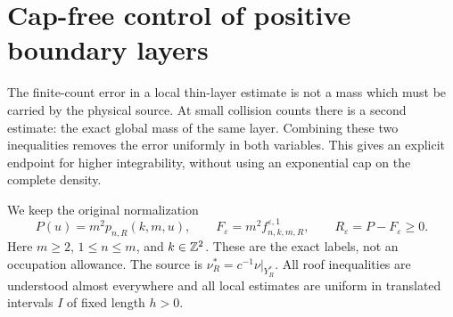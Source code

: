 \section{Cap-free control of positive boundary layers}
\label{sec:v55-cap-free}
The finite-count error in a local thin-layer estimate is not a mass
which must be carried by the physical source. At small collision counts
there is a second estimate: the exact global mass of the same layer.
Combining these two inequalities removes the error uniformly in both
variables. This gives an explicit endpoint for higher integrability,
without using an exponential cap on the complete density.

We keep the original normalization
\[
 P(u)=m^2p_{n,R}(k,m,u),\qquad
 F_\varepsilon=m^2f^{\varepsilon,1}_{n,k,m,R},\qquad
 R_\varepsilon=P-F_\varepsilon\ge0.
\]
Here $m\ge2$, $1\le n\le m$, and $k\in\mathbb Z^2$. These are the
exact labels, not an occupation allowance. The source is
$\nu_R^*=c^{-1}\nu|_{Y_R^*}$. All roof inequalities are understood
almost everywhere and all local estimates are uniform in translated
intervals $I$ of fixed length $h>0$.

